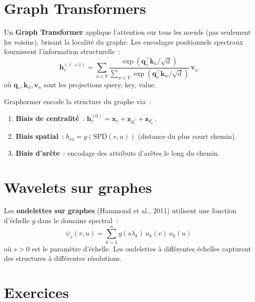 \section{Graph Transformers}

\begin{definition}
Un \textbf{Graph Transformer} applique l'attention sur tous les n\oe uds
(pas seulement les voisins), brisant la localit\'e du graphe. Les encodages
positionnels spectraux fournissent l'information structurelle~:
\[
    \mathbf{h}_v^{(\ell+1)} = \sum_{u \in V} \frac{\exp(\mathbf{q}_v^\top \mathbf{k}_u / \sqrt{d})}
    {\sum_{w \in V} \exp(\mathbf{q}_v^\top \mathbf{k}_w / \sqrt{d})}\, \mathbf{v}_u
\]
o\`u $\mathbf{q}_v, \mathbf{k}_u, \mathbf{v}_u$ sont les projections query, key, value.
\end{definition}

\begin{remarque}
Graphormer encode la structure du graphe via~:
\begin{enumerate}
    \item \textbf{Biais de centralit\'e}~: $\mathbf{h}_v^{(0)} = \mathbf{x}_v + \mathbf{z}_{d_v^+} + \mathbf{z}_{d_v^-}$.
    \item \textbf{Biais spatial}~: $b_{vu} = g(\text{SPD}(v, u))$ (distance du plus court chemin).
    \item \textbf{Biais d'ar\^ete}~: encodage des attributs d'ar\^etes le long du chemin.
\end{enumerate}
\end{remarque}

\section{Wavelets sur graphes}

\begin{definition}
Les \textbf{ondelettes sur graphes} (Hammond et al., 2011) utilisent une
fonction d'\'echelle $g$ dans le domaine spectral~:
\[
    \psi_s(v, u) = \sum_{k=1}^{n} g(s\lambda_k)\, u_k(v)\, u_k(u)
\]
o\`u $s > 0$ est le param\`etre d'\'echelle. Les ondelettes \`a diff\'erentes
\'echelles capturent des structures \`a diff\'erentes r\'esolutions.
\end{definition}

\section*{Exercices}

